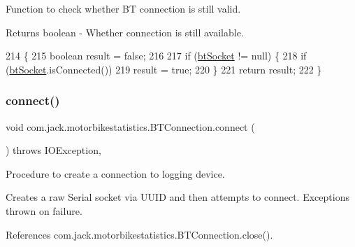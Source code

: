 Function to check whether BT connection is still valid. 

\begin{DoxyReturn}{Returns}
boolean -\/ Whether connection is still available. 
\end{DoxyReturn}

\begin{DoxyCode}
214                                  \{
215         \textcolor{keywordtype}{boolean} result = \textcolor{keyword}{false};
216 
217         \textcolor{keywordflow}{if} (\hyperlink{classcom_1_1jack_1_1motorbikestatistics_1_1_b_t_connection_a0d47f94a35f7c8a07429975446e7b33b}{btSocket} != null) \{
218             \textcolor{keywordflow}{if} (\hyperlink{classcom_1_1jack_1_1motorbikestatistics_1_1_b_t_connection_a0d47f94a35f7c8a07429975446e7b33b}{btSocket}.isConnected())
219                 result = \textcolor{keyword}{true};
220         \}
221         \textcolor{keywordflow}{return} result;
222     \}
\end{DoxyCode}
\mbox{\label{classcom_1_1jack_1_1motorbikestatistics_1_1_b_t_connection_a4c1b8ebff8a40a9cddd77a55b59b45af}} 
\subsubsection{\texorpdfstring{connect()}{connect()}}
{\footnotesize\ttfamily void com.\+jack.\+motorbikestatistics.\+B\+T\+Connection.\+connect (\begin{DoxyParamCaption}{ }\end{DoxyParamCaption}) throws I\+O\+Exception\hspace{0.3cm}{\ttfamily [inline]}, {\ttfamily [private]}}



Procedure to create a connection to logging device. 

Creates a raw Serial socket via U\+U\+ID and then attempts to connect. Exceptions thrown on failure. 

References com.\+jack.\+motorbikestatistics.\+B\+T\+Connection.\+close().


